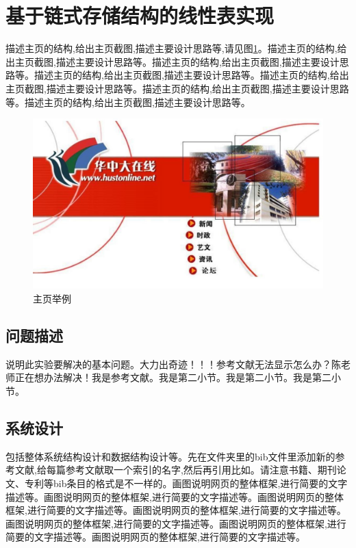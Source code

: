 \documentclass[supercite]{Experimental_Report}
\theoremstyle{definition}
\begin{document}
\newpage

\section{基于链式存储结构的线性表实现}

描述主页的结构,给出主页截图,描述主要设计思路等,请见图\ref{fig2-1}。描述主页的结构,给出主页截图,描述主要设计思路等。描述主页的结构,给出主页截图,描述主要设计思路等。描述主页的结构,给出主页截图,描述主要设计思路等。描述主页的结构,给出主页截图,描述主要设计思路等。描述主页的结构,给出主页截图,描述主要设计思路等。描述主页的结构,给出主页截图,描述主要设计思路等。

\begin{figure}[htb]
	\begin{center}
		\includegraphics[scale=0.40]{images/2-1.jpg}
		\caption{主页举例}
		\label{fig2-1}
	\end{center}
\end{figure}

\subsection{问题描述}

说明此实验要解决的基本问题。大力出奇迹！！！参考文献无法显示怎么办？陈老师正在想办法解决\cite{STR2021Neurocom, AVS2021Neurocom}！我是参考文献。我是第二小节\cite{Mehrabian1974An}。我是第二小节\cite{Rezaei2014CVPR}。我是第二小节\cite{Ramnath2008IJCV}。

\subsection{系统设计}

包括整体系统结构设计和数据结构设计等。先在文件夹里的bib文件里添加新的参考文献,给每篇参考文献取一个索引的名字,然后再引用比如\cite{STR2021Neurocom}\cite{AVS2021Neurocom, Rezaei2014CVPR}。请注意书籍、期刊论文、专利等bib条目的格式是不一样的。画图说明网页的整体框架,进行简要的文字描述等。画图说明网页的整体框架,进行简要的文字描述等。画图说明网页的整体框架,进行简要的文字描述等。画图说明网页的整体框架,进行简要的文字描述等。画图说明网页的整体框架,进行简要的文字描述等。画图说明网页的整体框架,进行简要的文字描述等。画图说明网页的整体框架,进行简要的文字描述等。
\end{document}
